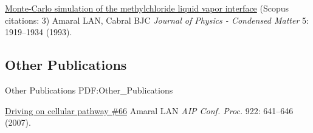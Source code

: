 \NumberedItem{\makebox[0.8cm][r]{[1]}}
\href{/people/amaral/monte-carlo-simulation-of-the-methylchloride-liquid-vapor-interface}
{Monte-Carlo simulation of the methylchloride liquid vapor interface}
    (Scopus citations: 3)
\newline
Amaral LAN, Cabral BJC
\newline
\textit{Journal of Physics - Condensed Matter}
    5:
1919--1934 (1993).
\newline
\Gap
~
\Gap

\vspace*{0.2cm}\subsection
{Other Publications}
{Other Publications}
{PDF:Other_Publications}

\GapNoBreak
\NumberedItem{\makebox[0.8cm][r]{[1]}}
\href{/people/amaral/driving-on-cellular-pathway-66}
{Driving on cellular pathway \#66}
\newline
Amaral LAN
\newline
\textit{AIP Conf. Proc.}
    922:
641--646 (2007).
\newline
\Gap
~
\Gap

\vspace*{0.2cm}